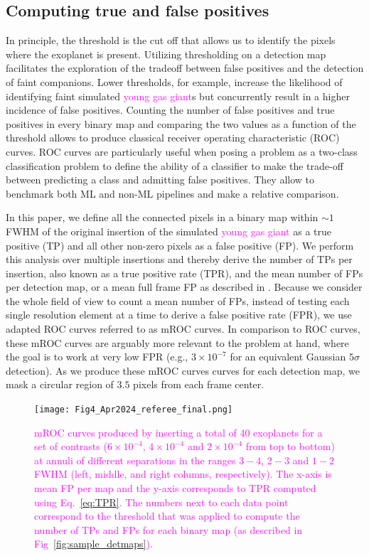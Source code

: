 \documentclass[referee]{aa} %
\newcommand{\newchange}[1]{\textcolor{magenta}{#1}}
\begin{document}
\subsection{Computing true and false positives}
\label{sec:TPFP}


In principle, the threshold is the cut off that allows us to identify the pixels where the exoplanet is present.
Utilizing thresholding on a detection map facilitates the exploration of the tradeoff between false positives and the detection of faint companions. Lower thresholds, for example, increase the likelihood of identifying faint simulated \newchange{young gas giant}s but concurrently result in a higher incidence of false positives.
Counting the number of false positives and true positives in every binary map and comparing the two values as a function of the threshold allows to produce classical receiver operating characteristic (ROC) curves. 
ROC curves are particularly useful when posing a problem as a two-class classification problem to define the ability of a classifier to make the trade-off between predicting a class and admitting false positives.
They allow to benchmark both ML and non-ML pipelines and make a relative comparison. 

In this paper, we define all the connected pixels in a binary map within $\sim 1$ FWHM of the original insertion of the simulated \newchange{young gas giant} as a true positive (TP) and all other non-zero pixels as a false positive (FP). We perform this analysis over multiple insertions and thereby derive the number of TPs per insertion, also known as a true positive rate (TPR), and the mean number of FPs per detection map, or a mean full frame FP as described in \citet{2018Gomez}. Because we consider the whole field of view to count a mean number of FPs, instead of testing each single resolution element at a time to derive a false positive rate (FPR), we use adapted ROC curves referred to as mROC curves. In comparison to ROC curves, these mROC curves are arguably more relevant to the problem at hand, where the goal is to work at very low FPR (e.g., $3\times 10^{-7}$ for an equivalent Gaussian $5\sigma$ detection). As we produce these mROC curves  curves for each detection map, we mask a circular region of $3.5$ pixels from each frame center.

\begin{figure}
\centering
    \texttt{[image: Fig4\_Apr2024\_referee\_final.png]}
\caption{ \newchange{mROC curves produced by inserting a total of 40 exoplanets for a set of contrasts ($6 \times 10^{-4}$, $4 \times 10^{-4}$ and $2 \times 10^{-4}$ from top to bottom) at annuli of different separations in the ranges $3-4$, $2-3$ and $1-2$ FWHM (left, middle, and right columns, respectively).
The x-axis is mean FP per map and the y-axis corresponds to TPR computed using Eq.~\ref{eq:TPR}. 
The numbers next to each data point correspond to the threshold that was applied to compute the number of TPs and FPs for each binary map (as described in Fig~\ref{fig:sample_detmaps}).
}}
    \label{fig:fig_4}
\end{figure}
\end{document}

